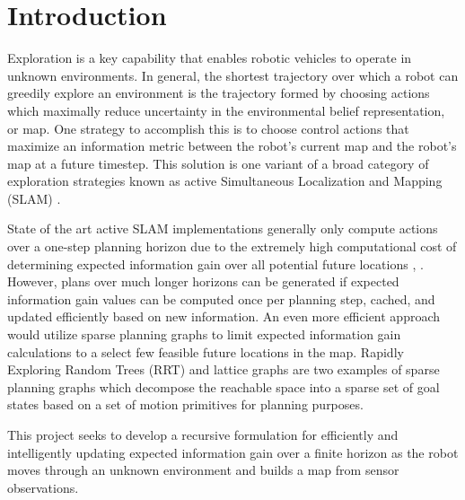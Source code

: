 \section{Introduction}
\label{section:introduction}

Exploration is a key capability that enables robotic vehicles to operate in unknown environments.
In general, the shortest trajectory over which a robot can greedily explore an environment is the trajectory formed by choosing actions which maximally reduce uncertainty in the environmental belief representation, or map.
One strategy to accomplish this is to choose control actions that maximize an information metric between the robot's current map and the robot's map at a future timestep.
This solution is one variant of a broad category of exploration strategies known as active Simultaneous Localization and Mapping (SLAM) \cite{thrun2005probabilistic}.

State of the art active SLAM implementations generally only compute actions over a one-step planning horizon due to the extremely high computational cost of determining expected information gain over all potential future locations \cite{bourgault2002information}, \cite{stachniss2005information}.
However, plans over much longer horizons can be generated if expected information gain values can be computed once per planning step, cached, and updated efficiently based on new information.
An even more efficient approach would utilize sparse planning graphs to limit expected information gain calculations to a select few feasible future locations in the map.
Rapidly Exploring Random Trees (RRT) and lattice graphs are two examples of sparse planning graphs which decompose the reachable space into a sparse set of goal states based on a set of motion primitives for planning purposes.

This project seeks to develop a recursive formulation for efficiently and intelligently updating expected information gain over a finite horizon as the robot moves through an unknown environment and builds a map from sensor observations.



